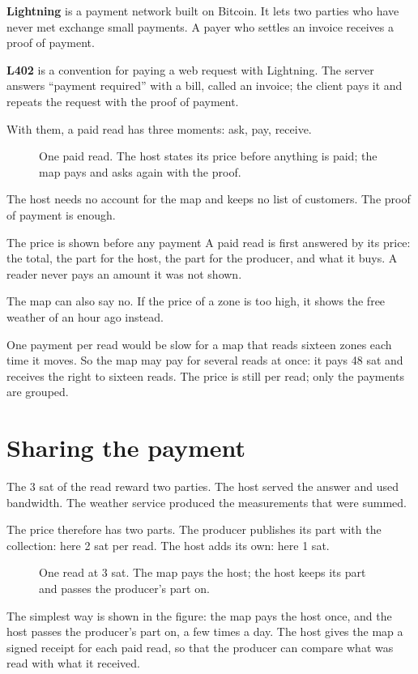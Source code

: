 \documentclass[11pt]{article}
\newcommand{\fig}[4][]{\begin{figure}[H]\centering\vspace{0.3em}\ixnew{figures/#2.tikz}\caption{#3}\label{fig:#4}\end{figure}}
\begin{document}
\textbf{Lightning} is a payment network built on Bitcoin. It lets two parties who have never met exchange small payments. A payer who settles an invoice receives a proof of payment.

\textbf{L402} is a convention for paying a web request with Lightning. The server answers ``payment required'' with a bill, called an invoice; the client pays it and repeats the request with the proof of payment.

With them, a paid read has three moments: ask, pay, receive.

\fig{pay}{One paid read. The host states its price before anything is paid; the map pays and asks again with the proof.}{pay}

The host needs no account for the map and keeps no list of customers. The proof of payment is enough.

\begin{guarantee}{The price is shown before any payment}
A paid read is first answered by its price: the total, the part for the host, the part for the producer, and what it buys. A reader never pays an amount it was not shown.
\end{guarantee}

The map can also say no. If the price of a zone is too high, it shows the free weather of an hour ago instead.

One payment per read would be slow for a map that reads sixteen zones each time it moves. So the map may pay for several reads at once: it pays 48 sat and receives the right to sixteen reads. The price is still per read; only the payments are grouped.

\section{Sharing the payment}

The 3 sat of the read reward two parties. The host served the answer and used bandwidth. The weather service produced the measurements that were summed.

The price therefore has two parts. The producer publishes its part with the collection: here 2 sat per read. The host adds its own: here 1 sat.

\fig{split}{One read at 3 sat. The map pays the host; the host keeps its part and passes the producer's part on.}{split}

The simplest way is shown in the figure: the map pays the host once, and the host passes the producer's part on, a few times a day. The host gives the map a signed receipt for each paid read, so that the producer can compare what was read with what it received.
\end{document}
